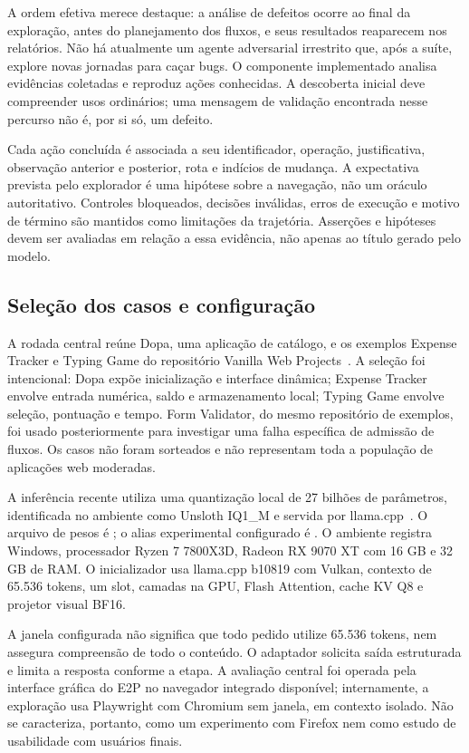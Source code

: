 \documentclass[12pt]{article}
\begin{document}
A ordem efetiva merece destaque: a análise de defeitos ocorre ao final da exploração, antes do planejamento dos fluxos, e seus resultados reaparecem nos relatórios. Não há atualmente um agente adversarial irrestrito que, após a suíte, explore novas jornadas para caçar bugs. O componente implementado analisa evidências coletadas e reproduz ações conhecidas. A descoberta inicial deve compreender usos ordinários; uma mensagem de validação encontrada nesse percurso não é, por si só, um defeito.

Cada ação concluída é associada a seu identificador, operação, justificativa, observação anterior e posterior, rota e indícios de mudança. A expectativa prevista pelo explorador é uma hipótese sobre a navegação, não um oráculo autoritativo. Controles bloqueados, decisões inválidas, erros de execução e motivo de término são mantidos como limitações da trajetória. Asserções e hipóteses devem ser avaliadas em relação a essa evidência, não apenas ao título gerado pelo modelo.

\subsection{Seleção dos casos e configuração}
A rodada central reúne Dopa, uma aplicação de catálogo, e os exemplos Expense Tracker e Typing Game do repositório Vanilla Web Projects~\cite{pieceofhell2026dopa,traversy2026vanilla}. A seleção foi intencional: Dopa expõe inicialização e interface dinâmica; Expense Tracker envolve entrada numérica, saldo e armazenamento local; Typing Game envolve seleção, pontuação e tempo. Form Validator, do mesmo repositório de exemplos, foi usado posteriormente para investigar uma falha específica de admissão de fluxos. Os casos não foram sorteados e não representam toda a população de aplicações web moderadas.

A inferência recente utiliza uma quantização local de 27 bilhões de parâmetros, identificada no ambiente como Unsloth IQ1\_M e servida por llama.cpp~\cite{ggml2026llama}. O arquivo de pesos é ; o alias experimental configurado é . O ambiente registra Windows, processador Ryzen 7 7800X3D, Radeon RX 9070 XT com 16 GB e 32 GB de RAM. O inicializador usa llama.cpp b10819 com Vulkan, contexto de 65.536 tokens, um slot, camadas na GPU, Flash Attention, cache KV Q8 e projetor visual BF16.

A janela configurada não significa que todo pedido utilize 65.536 tokens, nem assegura compreensão de todo o conteúdo. O adaptador solicita saída estruturada e limita a resposta conforme a etapa. A avaliação central foi operada pela interface gráfica do E2P no navegador integrado disponível; internamente, a exploração usa Playwright com Chromium sem janela, em contexto isolado. Não se caracteriza, portanto, como um experimento com Firefox nem como estudo de usabilidade com usuários finais.
\end{document}
